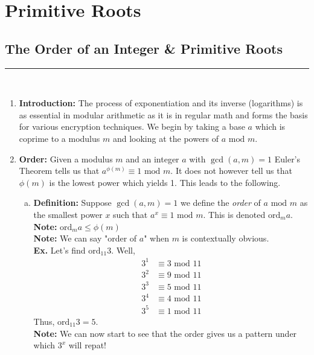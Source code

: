 \documentclass[class=article, crop=false]{standalone}
\begin{document}
    
\section{Primitive Roots}
\subsection{The Order of an Integer \& Primitive Roots}
\rule{\textwidth}{1pt}\\
\begin{enumerate}
\item \textbf{Introduction:} 
The process of exponentiation and its inverse (logarithms) is as essential in modular arithmetic as it 
is in regular math and forms the basis for various encryption techniques. We begin by taking a base $a$
which is coprime to a modulus $m$ and looking at the powers of $a\mbox{ mod }m$.

\item \textbf{Order:}
Given a modulus $m$ and an integer $a$ with $\gcd(a,m)=1$ Euler's Theorem tells us that
$a^{\phi(m)} \equiv 1\mbox{ mod }m$. It does not however tell us that $\phi(m)$ is the lowest
power which yields 1. This leads to the following.
\begin{enumerate}[(a)]
	\item \textbf{Definition:} Suppose $\gcd(a,m)=1$ we define the \emph{order} of $a\mbox{ mod }m$
	as the smallest power $x$ such that $a^x \equiv 1\mbox{ mod }m$. This is denoted $\mbox{ord}_m a$. \\
	\textbf{Note:} $\mbox{ord}_m a \leq \phi(m)$ \\
	\textbf{Note:} We can say "order of $a$" when $m$ is contextually obvious.\\
	\textbf{Ex.} Let's find $\mbox{ord}_{11} 3$. Well,
	\begin{align*}
		3^1 &\equiv 3\mbox{ mod }11 \\
		3^2 &\equiv 9\mbox{ mod }11 \\
		3^3 &\equiv 5\mbox{ mod }11 \\
		3^4 &\equiv 4\mbox{ mod }11 \\
		3^5 &\equiv 1\mbox{ mod }11
	\end{align*}
	Thus, $\mbox{ord}_{11} 3 = 5$. \\
	\textbf{Note:} We can now start to see that the order gives us a pattern under which
	$3^x$ will repat!
	

\end{enumerate}
\end{enumerate}
\end{document}

